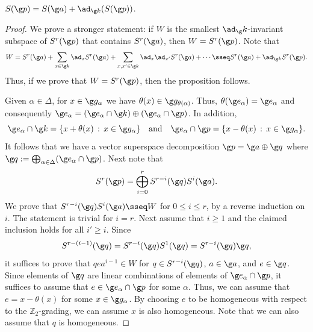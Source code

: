 \documentclass[11pt]{amsart}
\begin{document}
\begin{prp}\label{U=S(a)}
	$S(\g p)=S(\g a)+\ad_{\g k}(S(\g p))$.
\end{prp} 
\begin{proof}
We prove a stronger statement: if $W$ is the smallest $\ad_\g k$-invariant subspace of $S^r(\g p)$ that contains $S^r(\g a)$, then $W=S^r(\g p)$. 
	Note that 
	\[
	W=S^r(\g a)+\sum_{x\in \g k}\ad_xS^r(\g a)+
	\sum_{x,x'\in \g k}\ad_x\ad_{x'}S^r(\g a)+\cdots 
	\sseq S^r(\g a)+
	\ad_{\g k} S^r(\g p).
	\]
	Thus, if we prove that $W=S^r(\g p)$, then the proposition follows.  

Given $\alpha\in\Delta$, for $x\in\g g_\alpha$ we have $\theta(x)\in\g g_{\theta(\alpha)}$.
 Thus, $\theta(\g e_\alpha)=\g e_\alpha$ and consequently $\g e_\alpha=(\g e_\alpha\cap \g k)\oplus (\g e_{\alpha}\cap\g p)$. In addition, 
	\[
	\g e_\alpha\cap\g k=\{x+\theta(x)\,:\,x\in\g g_\alpha
	\}\quad
	\text{and}\quad 
	\g e_\alpha\cap\g p=\{x-\theta(x)\,:\,x\in\g g_\alpha\}. 
	\]
	It follows that we have a vector superspace decomposition $\g p=\g a\oplus \g q$ where $\g q:=\bigoplus_{\alpha\in\Delta}(\g e_\alpha\cap \g p)$. Next note that
	\[
	S^r(\g p)=\bigoplus_{i=0}^r S^{r-i}(\g q)S^i(\g a).
	\]
	We prove  that $S^{r-i}(\g q)S^i(\g a)\sseq W$ for $0\leq i\leq r$, by a reverse induction on $i$.
	The statement is trivial for 
	$i=r$. Next assume that $i\geq 1$ and the claimed inclusion holds for all $i'\geq i$. Since \[
	S^{r-(i-1)}(\g q)=S^{r-i}(\g q)S^1(\g q)=S^{r-i}(\g q)\g q,
	\] 
	it suffices to prove that  
	$qea^{i-1}\in W$ for $q\in S^{r-i}(\g q)$, $a\in \g a$, and $e\in \g q$. Since elements of $\g q$ are linear combinations of elements of $\g e_\alpha\cap \g p$, it suffices to assume that $e\in \g e_\alpha\cap\g p$ for some $\alpha$. Thus, we can assume that $e=x-\theta(x)$ for some $x\in \g g_\alpha$. By choosing $e$ to be homogeneous with respect to the $\mathbb{Z}_2$-grading, we can assume $x$ is also homogeneous. Note that we can also assume that $q$ is homogeneous.


\end{proof}
\end{document}

